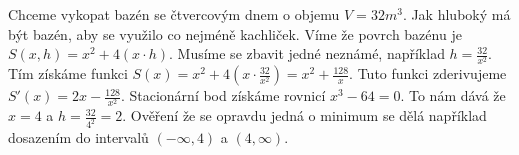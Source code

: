 \documentclass[12pt]{article}
\begin{document}
Chceme vykopat bazén se čtvercovým dnem o objemu $V = 32 m^3$. Jak hluboký má být bazén, aby se
využilo co nejméně kachliček. Víme že povrch bazénu je $S(x, h) = x^2 + 4(x \cdot h)$. Musíme se
zbavit jedné neznámé, například $h = \frac{32}{x^2}$. Tím získáme funkci $S(x) = x^2 + 4(x \cdot
\frac{32}{x^2}) = x^2 + \frac{128}{x}$. Tuto funkci zderivujeme $S'(x) = 2x - \frac{128}{x^2}$.
Stacionární bod získáme rovnicí $x^3 - 64 = 0$. To nám dává že $x = 4$ a $h = \frac{32}{4^2} = 2$.
Ověření že se opravdu jedná o minimum se dělá například dosazením do intervalů $(-\infty, 4)$ a
$(4, \infty)$.
\end{document}
